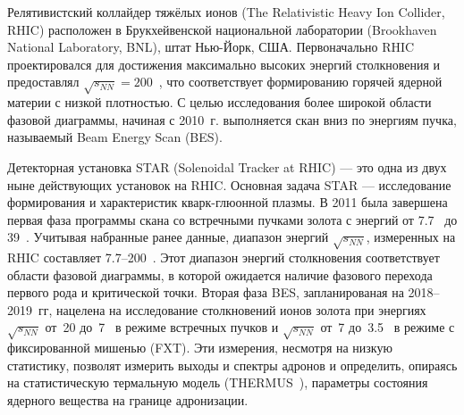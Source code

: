 \bigskip




Релятивистский коллайдер тяжёлых ионов (The Relativistic Heavy Ion Collider, RHIC) расположен в Брукхейвенской национальной лаборатории (Brookhaven National Laboratory, BNL), штат Нью-Йорк, США. Первоначально RHIC проектировался для достижения максимально высоких энергий столкновения и предоставлял $\sqrt{s_{NN}}=200$~\GeVperNucl{}, что соответствует формированию горячей ядерной материи с низкой плотностью. С целью исследования более широкой области фазовой диаграммы, начиная с 2010~г. выполняется скан вниз по энергиям пучка, называемый Beam Energy Scan (BES).

Детекторная установка STAR (Solenoidal Tracker at RHIC) --- это одна из двух ныне действующих установок на RHIC. Основная задача STAR --- исследование формирования и характеристик кварк-глюонной плазмы. В 2011 была завершена первая фаза программы скана со встречными пучками золота с энергий от 7.7~\GeVperNucl{} до 39~\GeVperNucl{}. Учитывая набранные ранее данные, диапазон энергий $\sqrt{s_{NN}}$, измеренных на RHIC составляет 7.7--200~\GeVperNucl{}. Этот диапазон энергий столкновения соответствует области фазовой диаграммы, в которой ожидается наличие фазового перехода первого рода и критической точки. Вторая фаза BES, запланированая на 2018--2019~гг, нацелена на исследование столкновений ионов золота при энергиях $\sqrt{s_{NN}}$ от~20 до~7~\GeVperNucl{} в режиме встречных пучков и $\sqrt{s_{NN}}$ от~7 до~3.5~\GeVperNucl{} в режиме с фиксированной мишенью (FXT). Эти измерения, несмотря на низкую статистику, позволят измерить выходы и спектры адронов и определить, опираясь на статистическую термальную модель (THERMUS~\cite{THERMUS}), параметры состояния ядерного вещества на границе адронизации.

\bigskip



